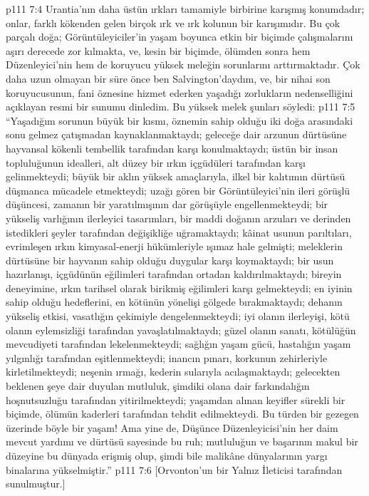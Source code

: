 \vs p111 7:4 Urantia’nın daha üstün ırkları tamamiyle birbirine karışmış konumdadır; onlar, farklı kökenden gelen birçok ırk ve ırk kolunun bir karışımıdır. Bu çok parçalı doğa; Görüntüleyiciler’in yaşam boyunca etkin bir biçimde çalışmalarını aşırı derecede zor kılmakta, ve, kesin bir biçimde, ölümden sonra hem Düzenleyici’nin hem de koruyucu yüksek meleğin sorunlarını arttırmaktadır. Çok daha uzun olmayan bir süre önce ben Salvington'daydım, ve, bir nihai son koruyucusunun, fani öznesine hizmet ederken yaşadığı zorlukların nedenselliğini açıklayan resmi bir sunumu dinledim. Bu yüksek melek şunları söyledi:
\vs p111 7:5 “Yaşadığım sorunun büyük bir kısmı, öznemin sahip olduğu iki doğa arasındaki sonu gelmez çatışmadan kaynaklanmaktaydı; geleceğe dair arzunun dürtüsüne hayvansal kökenli tembellik tarafından karşı konulmaktaydı; üstün bir insan topluluğunun idealleri, alt düzey bir ırkın içgüdüleri tarafından karşı gelinmekteydi; büyük bir aklın yüksek amaçlarıyla, ilkel bir kalıtımın dürtüsü düşmanca mücadele etmekteydi; uzağı gören bir Görüntüleyici’nin ileri görüşlü düşüncesi, zamanın bir yaratılmışının dar görüşüyle engellenmekteydi; bir yükseliş varlığının ilerleyici tasarımları, bir maddi doğanın arzuları ve derinden istedikleri şeyler tarafından değişikliğe uğramaktaydı; kâinat usunun parıltıları, evrimleşen ırkın kimyasal\hyp{}enerji hükümleriyle ışımaz hale gelmişti; meleklerin dürtüsüne bir hayvanın sahip olduğu duygular karşı koymaktaydı; bir usun hazırlanışı, içgüdünün eğilimleri tarafından ortadan kaldırılmaktaydı; bireyin deneyimine, ırkın tarihsel olarak birikmiş eğilimleri karşı gelmekteydi; en iyinin sahip olduğu hedeflerini, en kötünün yönelişi gölgede bırakmaktaydı; dehanın yükseliş etkisi, vasatlığın çekimiyle dengelenmekteydi; iyi olanın ilerleyişi, kötü olanın eylemsizliği tarafından yavaşlatılmaktaydı; güzel olanın sanatı, kötülüğün mevcudiyeti tarafından lekelenmekteydi; sağlığın yaşam gücü, hastalığın yaşam yılgınlığı tarafından eşitlenmekteydi; inancın pınarı, korkunun zehirleriyle kirletilmekteydi; neşenin ırmağı, kederin sularıyla acılaşmaktaydı; gelecekten beklenen şeye dair duyulan mutluluk, şimdiki olana dair farkındalığın hoşnutsuzluğu tarafından yitirilmekteydi; yaşamdan alınan keyifler sürekli bir biçimde, ölümün kaderleri tarafından tehdit edilmekteydi. Bu türden bir gezegen üzerinde böyle bir yaşam! Ama yine de, Düşünce Düzenleyicisi’nin her daim mevcut yardımı ve dürtüsü sayesinde bu ruh; mutluluğun ve başarının makul bir düzeyine bu dünyada erişmiş olup, şimdi bile malikâne dünyalarının yargı binalarına yükselmiştir.”
\vs p111 7:6 [Orvonton’un bir Yalnız İleticisi tarafından sunulmuştur.]

